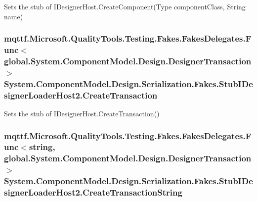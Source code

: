 Sets the stub of I\-Designer\-Host.\-Create\-Component(\-Type component\-Class, String name)

\hypertarget{class_system_1_1_component_model_1_1_design_1_1_serialization_1_1_fakes_1_1_stub_i_designer_loader_host2_ad71034bd2a29ff8627654cbbcec0af61}{
\subsubsection[{Create\-Transaction}]{\setlength{\rightskip}{0pt plus 5cm}mqttf.\-Microsoft.\-Quality\-Tools.\-Testing.\-Fakes.\-Fakes\-Delegates.\-Func$<$global.\-System.\-Component\-Model.\-Design.\-Designer\-Transaction$>$ System.\-Component\-Model.\-Design.\-Serialization.\-Fakes.\-Stub\-I\-Designer\-Loader\-Host2.\-Create\-Transaction}}\label{class_system_1_1_component_model_1_1_design_1_1_serialization_1_1_fakes_1_1_stub_i_designer_loader_host2_ad71034bd2a29ff8627654cbbcec0af61}


Sets the stub of I\-Designer\-Host.\-Create\-Transaction()

\hypertarget{class_system_1_1_component_model_1_1_design_1_1_serialization_1_1_fakes_1_1_stub_i_designer_loader_host2_ae9682502a5bc02d890a8f9399ff0ffee}{
\subsubsection[{Create\-Transaction\-String}]{\setlength{\rightskip}{0pt plus 5cm}mqttf.\-Microsoft.\-Quality\-Tools.\-Testing.\-Fakes.\-Fakes\-Delegates.\-Func$<$string, global.\-System.\-Component\-Model.\-Design.\-Designer\-Transaction$>$ System.\-Component\-Model.\-Design.\-Serialization.\-Fakes.\-Stub\-I\-Designer\-Loader\-Host2.\-Create\-Transaction\-String}}\label{class_system_1_1_component_model_1_1_design_1_1_serialization_1_1_fakes_1_1_stub_i_designer_loader_host2_ae9682502a5bc02d890a8f9399ff0ffee}


